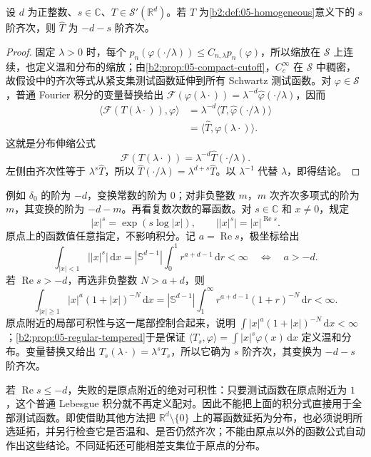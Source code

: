 \begin{proposition}\label{b2:prop:05-homogeneous-transform}
设 \(d\) 为正整数、\(s\in\mathbb C\)、\(T\in\mathcal S'(\mathbb R^d)\)。若 \(T\) 为\cref{b2:def:05-homogeneous}意义下的 \(s\) 阶齐次，则 \(\widehat T\) 为 \(-d-s\) 阶齐次。
\end{proposition}
\begin{proof}
固定 \(\lambda>0\) 时，每个 \(p_n(\varphi(\cdot/\lambda))\leq C_{n,\lambda}p_n(\varphi)\)，所以缩放在 \(\mathcal S\) 上连续，也定义温和分布的缩放；由\cref{b2:prop:05-compact-cutoff}，\(C_c^\infty\) 在 \(\mathcal S\) 中稠密，故假设中的齐次等式从紧支集测试函数延伸到所有 Schwartz 测试函数。对 \(\varphi\in\mathcal S\)，普通 Fourier 积分的变量替换给出 \(\mathcal F(\varphi(\lambda\cdot))=\lambda^{-d}\widehat\varphi(\cdot/\lambda)\)，因而
\[
 \begin{aligned}
 \langle\mathcal F(T(\lambda\cdot)),\varphi\rangle
 &=\lambda^{-d}\langle T,\widehat\varphi(\cdot/\lambda)\rangle\\
 &=\langle\widehat T,\varphi(\lambda\cdot)\rangle.
 \end{aligned}
\]
这就是分布伸缩公式
\[
 \mathcal F(T(\lambda\cdot))
 =\lambda^{-d}\widehat T(\cdot/\lambda).
\]
左侧由齐次性等于 \(\lambda^s\widehat T\)，所以 \(\widehat T(\cdot/\lambda)=\lambda^{d+s}\widehat T\)。以 \(\lambda^{-1}\) 代替 \(\lambda\)，即得结论。
\end{proof}

例如 \(\delta_0\) 的阶为 \(-d\)，变换常数的阶为 \(0\)；对非负整数 \(m\)，\(m\) 次齐次多项式的阶为 \(m\)，其变换的阶为 \(-d-m\)。再看复数次数的幂函数。对 \(s\in\mathbb C\) 和 \(x\ne0\)，规定
\[
 |x|^s=\exp(s\log|x|),\qquad
 \bigl||x|^s\bigr|=|x|^{\operatorname{Re}s}.
\]
原点上的函数值任意指定，不影响积分。记 \(a=\operatorname{Re}s\)，极坐标给出
\[
 \int_{|x|<1}\bigl||x|^s\bigr|\,\mathrm{d}x
 =|\mathbb S^{d-1}|\int_0^1r^{a+d-1}\,\mathrm{d}r<\infty
 \quad\Longleftrightarrow\quad a>-d.
\]
若 \(\operatorname{Re}s>-d\)，再选非负整数 \(N>a+d\)，则
\[
 \int_{|x|\geq1}|x|^a(1+|x|)^{-N}\,\mathrm{d}x
 =|\mathbb S^{d-1}|\int_1^\infty r^{a+d-1}(1+r)^{-N}\,\mathrm{d}r<\infty.
\]
原点附近的局部可积性与这一尾部控制合起来，说明 \(\int |x|^a(1+|x|)^{-N}\,\mathrm{d}x<\infty\)；\cref{b2:prop:05-regular-tempered}于是保证 \(\langle T_s,\varphi\rangle=\int|x|^s\varphi(x)\,\mathrm{d}x\) 定义温和分布。变量替换又给出 \(T_s(\lambda\cdot)=\lambda^sT_s\)，所以它确为 \(s\) 阶齐次，其变换为 \(-d-s\) 阶齐次。

若 \(\operatorname{Re}s\leq-d\)，失败的是原点附近的绝对可积性：只要测试函数在原点附近为 \(1\)，这个普通 Lebesgue 积分就不再定义配对。因此不能把上面的积分式直接用于全部测试函数。即使借助其他方法把 \(\mathbb R^d\setminus\{0\}\) 上的幂函数延拓为分布，也必须说明所选延拓，并另行检查它是否温和、是否仍然齐次；不能由原点以外的函数公式自动作出这些结论。不同延拓还可能相差支集位于原点的分布。

